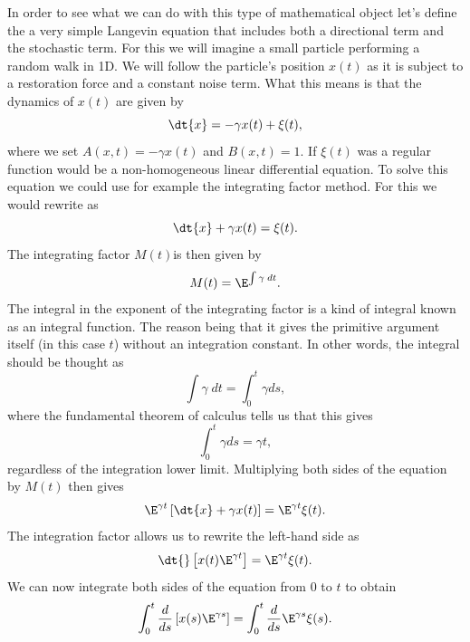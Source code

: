 In order to see what we can do with this type of mathematical object let's
define the a very simple Langevin equation that includes both a directional
term and the stochastic term. For this we will imagine a small particle
performing a random walk in 1D. We will follow the particle's position $x(t)$
as it is subject to a restoration force and a constant noise term. What this
means is that the dynamics of $x(t)$ are given by
\begin{equation}
  \dt{x} = -\gamma x(t) + \xi(t),
  \label{eq_random_walk_langevin}
\end{equation}
where we set $A(x, t) = -\gamma x(t)$ and $B(x, t) = 1$. If $\xi(t)$ was a
regular function  would be a non-homogeneous
linear differential equation. To solve this equation we could use for example
the integrating factor method. For this we would rewrite
 as
\begin{equation}
  \dt{x} + \gamma x(t) = \xi(t).
\end{equation}
The integrating factor $M(t) $is then given by
\begin{equation}
  M(t) = \E^{\int \gamma \; dt}.
\end{equation}
The integral in the exponent of the integrating factor is a kind of integral
known as an integral function. The reason being that it gives the primitive
argument itself (in this case $t$) without an integration constant. In other
words, the integral should be thought as
\begin{equation}
  \int \gamma \; dt = \int_0^t \gamma ds,
\end{equation}
where the fundamental theorem of calculus tells us that this gives
\begin{equation}
  \int_0^t \gamma ds = \gamma t,
\end{equation}
regardless of the integration lower limit. Multiplying both sides of the
equation by $M(t)$ then gives
\begin{equation}
  \E^{\gamma t} \left[ \dt{x} + \gamma x(t) \right] =
  \E^{\gamma t} \xi(t).
\end{equation}
The integration factor allows us to rewrite the left-hand side as
\begin{equation}
  \dt{}\left[ x(t) \E^{\gamma t} \right] = 
  \E^{\gamma t} \xi(t).
\end{equation}
We can now integrate both sides of the equation from 0 to $t$ to obtain
\begin{equation}
  \int_0^t {d \over ds}\left[ x(s) \E^{\gamma s} \right] =
  \int_0^t {d \over ds} \E^{\gamma s} \xi(s).
\end{equation}
